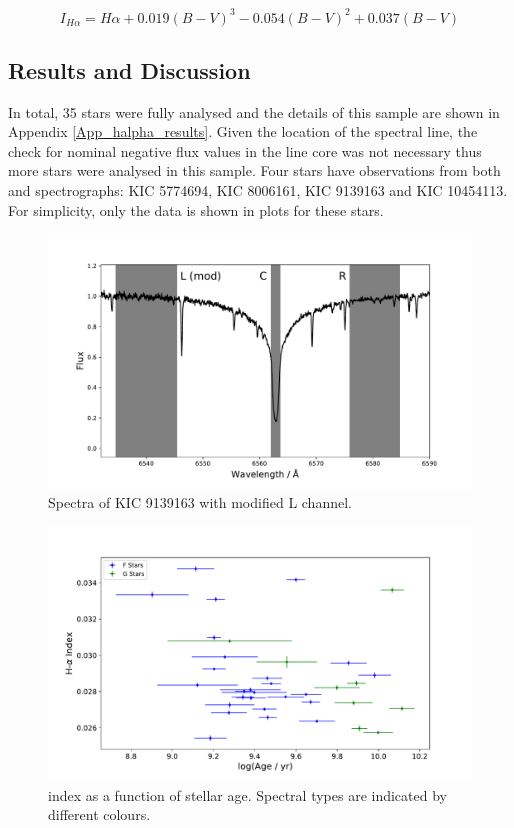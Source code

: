 \begin{equation}
    I_{H\alpha} = H\alpha + 0.019(B-V)^{3} - 0.054(B-V)^{2} + 0.037(B-V)
    \label{Eq:I_H_alpha}
\end{equation}

\subsection{Results and Discussion}
In total, 35 stars were fully analysed and the details of this sample are shown in Appendix \ref{App_halpha_results}. Given the location of the \Halpha spectral line, the check for nominal negative flux values in the line core was not necessary thus more stars were analysed in this sample. Four stars have observations from both \esp and \narval spectrographs: KIC 5774694, KIC 8006161, KIC 9139163 and KIC 10454113. For simplicity, only the \narval data is shown in plots for these stars.

\begin{figure}
    \centering
    \includegraphics[scale=0.55]{Figures/4-Chromospheric_age/halpha_modified_channels.pdf}
    \caption[Spectra of KIC 9139163 with modified \Halpha channels]{Spectra of KIC 9139163 with modified \Halpha L channel.}
    \label{fig:modified_halpha_channels}
\end{figure}

\begin{figure}
    \centering
    \includegraphics[scale=0.55]{Figures/4-Chromospheric_age/all_data_Halpha_index.pdf}
    \caption[\Halpha index as a function of stellar age]{\Halpha index as a function of stellar age. Spectral types are indicated by different colours.}
    \label{fig:mod_halpha_index_v_age}
\end{figure}

